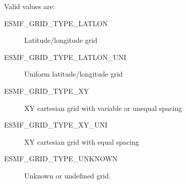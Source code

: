  Valid values are:
 \begin{description}
    \item [ESMF\_GRID\_TYPE\_LATLON]
          Latitude/longitude grid
 
    \item [ESMF\_GRID\_TYPE\_LATLON\_UNI]
          Uniform latitude/longitude grid
 
    \item [ESMF\_GRID\_TYPE\_XY]
          XY cartesian grid with variable or unequal spacing
 
    \item [ESMF\_GRID\_TYPE\_XY\_UNI]
          XY cartesian grid with equal spacing
 
    \item [ESMF\_GRID\_TYPE\_UNKNOWN]
          Unknown or undefined grid.

 \end{description}



